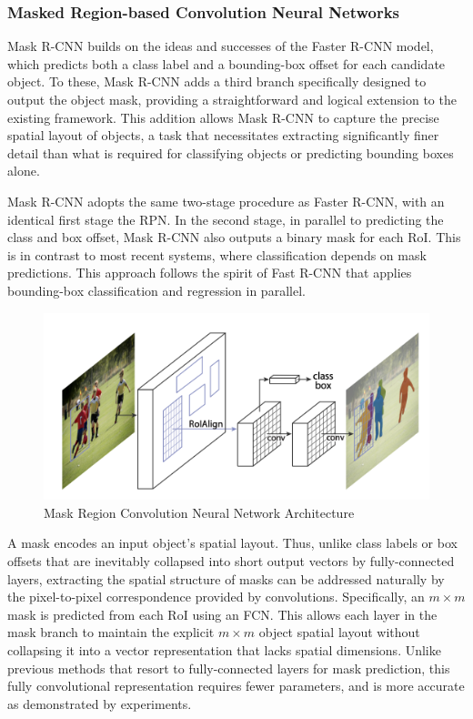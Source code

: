 \subsubsection{Masked Region-based Convolution Neural Networks}

Mask R-CNN \cite{mrcnn} builds on the ideas and successes of the Faster R-CNN model, which predicts both a class label and a bounding-box offset for each candidate object. 
To these, Mask R-CNN adds a third branch specifically designed to output the object mask, providing a straightforward and logical extension to the 
existing framework. This addition allows Mask R-CNN to capture the precise spatial layout of objects, a task that necessitates extracting significantly 
finer detail than what is required for classifying objects or predicting bounding boxes alone.

Mask R-CNN adopts the same two-stage procedure as Faster R-CNN, with an identical first stage the RPN. In the second stage, in parallel to predicting 
the class and box offset, Mask R-CNN also outputs a binary mask for each RoI. This is in contrast to most recent systems, where classification 
depends on mask predictions. This approach follows the spirit of Fast R-CNN that applies bounding-box classification and regression in parallel.


\begin{figure}[h!]
    \centering
    \includegraphics[scale=0.5]{Figures/mask-r-cnn.png}
    \caption{Mask Region Convolution Neural Network Architecture \cite{mrcnn}}
    \label{fig:mask-r-cnn}
\end{figure}

\newpage
A mask encodes an input object’s spatial layout. Thus, unlike class labels or box offsets that are inevitably collapsed into short output vectors by
fully-connected layers, extracting the spatial structure of masks can be addressed naturally by the pixel-to-pixel correspondence provided by convolutions.
Specifically, an $m \times m$ mask is predicted from each RoI using an FCN. This allows each layer in the mask branch to maintain the explicit $m \times m$ object 
spatial layout without collapsing it into a vector representation that lacks spatial dimensions. Unlike previous methods that resort to fully-connected layers 
for mask prediction, this fully convolutional representation requires fewer parameters, and is more accurate as demonstrated by experiments.

